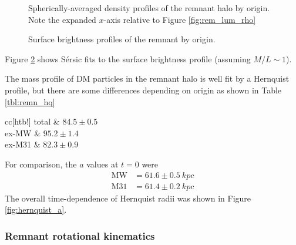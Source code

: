 \documentclass[twocolumn]{aastex63}
\begin{document}
\begin{figure}[htb!]
	\caption{Spherically-averaged density profiles of the remnant halo by origin. Note the expanded $x$-axis relative to Figure \ref{fig:rem_lum_rho}
		\label{fig:rem_DM_rho}}
\end{figure}

\begin{figure}[htb!]
	\caption{Surface brightness profiles of the remnant by origin.
		\label{fig:rem_sersic_origin}}
\end{figure}

Figure \ref{fig:rem_sersic_origin} shows Sérsic fits to the surface brightness profile (assuming $M/L \sim 1$).

The mass profile of DM particles in the remnant halo is well fit by a Hernquist profile, but there are some differences depending on origin as shown in Table \ref{tbl:remn_hq}

\begin{deluxetable}{cc}[htb!]
	\tablewidth{0pt}
	\startdata
	total &  $84.5 \pm 0.5$  \\
	ex-MW &   $95.2 \pm 1.4$  \\
	ex-M31 &   $82.3 \pm 0.9$
	\enddata
\end{deluxetable}

For comparison, the $a$ values at $t=0$ were 
\begin{align*}
	\text{MW} &= 61.6 \pm 0.5\ kpc\\
	\text{M31} &= 61.4 \pm 0.2\ kpc
\end{align*}
The overall time-dependence of Hernquist radii was shown in Figure \ref{fig:hernquist_a}.


\subsubsection{Remnant rotational kinematics}
\end{document}
